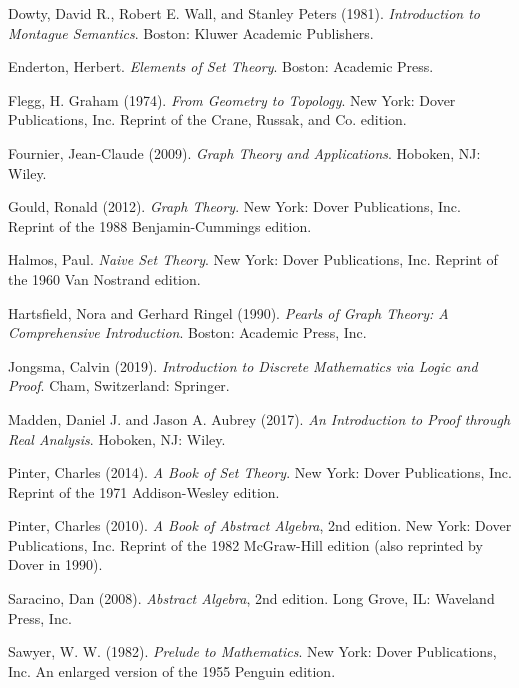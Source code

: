 \documentclass[../../../main.tex]{subfiles}
\begin{document}
\begin{thebibliography}{99}
  Dowty, David R., Robert E. Wall, and Stanley Peters (1981).
  \emph{Introduction to Montague Semantics}.
  Boston: Kluwer Academic Publishers.
  
  Enderton, Herbert.
  \emph{Elements of Set Theory}.
  Boston: Academic Press.
  
  Flegg, H. Graham (1974).
  \emph{From Geometry to Topology}.
  New York: Dover Publications, Inc. Reprint of the Crane, Russak, and Co. edition.
  
  Fournier, Jean-Claude (2009).
  \emph{Graph Theory and Applications}.
  Hoboken, NJ: Wiley.
  
  Gould, Ronald (2012).
  \emph{Graph Theory}.
  New York: Dover Publications, Inc. Reprint of the 1988 Benjamin-Cummings edition.
  
  Halmos, Paul.
  \emph{Naive Set Theory}.
  New York: Dover Publications, Inc. Reprint of the 1960 Van Nostrand edition.
  
  Hartsfield, Nora and Gerhard Ringel (1990).
  \emph{Pearls of Graph Theory: A Comprehensive Introduction}.
  Boston: Academic Press, Inc.
  
  Jongsma, Calvin (2019).
  \emph{Introduction to Discrete Mathematics via Logic and Proof}.
  Cham, Switzerland: Springer.

  Madden, Daniel J. and Jason A. Aubrey (2017).
  \emph{An Introduction to Proof through Real Analysis}.
  Hoboken, NJ: Wiley.

  Pinter, Charles (2014).
  \emph{A Book of Set Theory}.
  New York: Dover Publications, Inc. Reprint of the 1971 Addison-Wesley edition.
  
  Pinter, Charles (2010).
  \emph{A Book of Abstract Algebra}, 2nd edition.
  New York: Dover Publications, Inc. Reprint of the 1982 McGraw-Hill edition (also reprinted by Dover in 1990).

  Saracino, Dan (2008).
  \emph{Abstract Algebra}, 2nd edition.
  Long Grove, IL: Waveland Press, Inc.

  Sawyer, W. W. (1982).
  \emph{Prelude to Mathematics}.
  New York: Dover Publications, Inc. An enlarged version of the 1955 Penguin edition.


\end{thebibliography}
\end{document}
